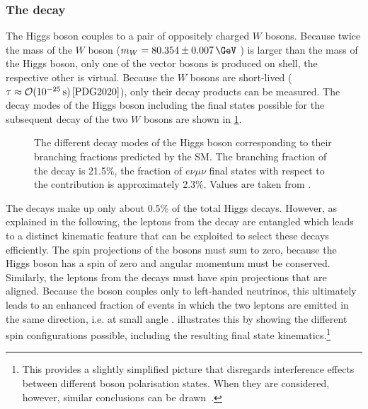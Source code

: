 \subsubsection{The \HWWdet decay}
The Higgs boson couples to a pair of oppositely charged $W$ bosons.
Because twice the mass of the $W$ boson ($m_W = 80.354 \pm 0.007\,\GeV$ \cite{PDG2020}) is larger than the mass of the Higgs boson, only one of the vector bosons is produced on shell, the respective other is virtual.
Because the $W$ bosons are short-lived ($\tau \approx \mathcal{O}(10^{-25}\,\text{s})\,\text{\cite{PDG2020}}$), only their decay products can be measured. 
The decay modes of the Higgs boson including the final states possible for the subsequent decay of the two $W$ bosons are shown in \cref{fig:h-branching-ratios}. 
\begin{figure}[th]
    \caption[Branching fraction per decay mode of the Higgs boson.]{The different decay modes of the Higgs boson corresponding to their branching fractions predicted by the SM. The branching fraction of the \HWW decay is 21.5\%, the fraction of $e\nu\mu\nu$ final states with respect to the \HWW contribution is approximately 2.3\%. Values are taken from .}
    \label{fig:h-branching-ratios}
\end{figure}

The \HWWdet decays make up only about 0.5\% of the total Higgs decays. However, as explained in the following, the leptons from the \HWWdet decay are entangled which leads to a distinct kinematic feature that can be exploited to select these decays efficiently.
The spin projections of the \Wboson bosons must sum to zero, because the Higgs boson has a spin of zero and angular momentum must be conserved.
Similarly, the leptons from the \Wboson decays must have spin projections that are aligned. Because the \Wboson boson couples only to left-handed neutrinos, this ultimately leads to an enhanced fraction of \HWWdet events in which the two leptons are emitted in the same direction, i.e. at small angle \dphill.
 illustrates this by showing the different spin configurations possible, including the resulting final state kinematics.\footnote{This provides a slightly simplified picture that disregards interference effects between different \Wboson boson polarisation states. When they are considered, however, similar conclusions can be drawn~\cite{Maina_2021}.}

